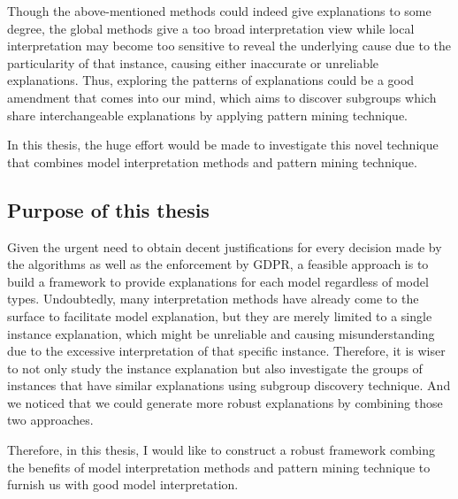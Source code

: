 Though the above-mentioned methods could indeed give explanations to some degree, the global methods give a too broad interpretation view while local interpretation may become too sensitive to reveal the underlying cause due to the particularity of that instance, causing either inaccurate or unreliable explanations. Thus, exploring the patterns of explanations could be a good amendment that comes into our mind, which aims to discover subgroups which share interchangeable explanations by applying pattern mining technique. 

In this thesis, the huge effort would be made to investigate this novel technique that combines model interpretation methods and pattern mining technique. 

\subsection{Purpose of this thesis}

Given the urgent need to obtain decent justifications for every decision made by the algorithms as well as the enforcement by GDPR, a feasible approach is to build a framework to provide explanations for each model regardless of model types. Undoubtedly, many interpretation methods have already come to the surface to facilitate model explanation, but they are merely limited to a single instance explanation, which might be unreliable and causing misunderstanding due to the excessive interpretation of that specific instance. Therefore, it is wiser to not only study the instance explanation but also investigate the groups of instances that have similar explanations using subgroup discovery technique. And we noticed that we could generate more robust explanations by combining those two approaches. 

Therefore, in this thesis, I would like to construct a robust framework combing the benefits of model interpretation methods and pattern mining technique to furnish us with good model interpretation. 


%
%	
%	
%	
%	
%	


